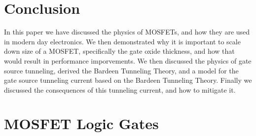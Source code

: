 \documentclass[
  reprint,
  amsmath,amssymb,
  aps
]{revtex4-1}
\begin{document}
\section{\label{sec:level1}Conclusion}
In this paper we have discussed the physics of MOSFETs, and how they are used in modern day electronics. We then demonstrated 
why it is important to scale down size of a MOSFET, specifically the gate oxide thickness, and how that would result in 
performance imporvements. We then discussed the physics of gate source tunneling, derived the Bardeen Tunneling Theory, and a 
model for the gate source tunneling current based on the Bardeen Tunneling Theory. Finally we discussed the consequences of this 
tunneling current, and how to mitigate it.





\appendix
\section{MOSFET Logic Gates}
\end{document}
